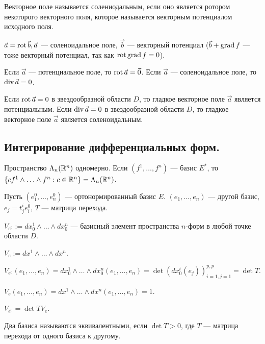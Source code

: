 \begin{Def}
	Векторное поле называется солениодальным, если оно является ротором некоторого векторного поля, которое называется векторным потенциалом исходного поля.
	
	$\vec{a}=\operatorname{rot}\vec{b}, \vec{a}$ --- соленоидальное поле, $\vec{b}$ --- векторный потенциал ($\vec{b}+\operatorname{grad} f$ --- тоже  векторный потенциал, так как $\operatorname{rot}\operatorname{grad} f=0$).
\end{Def}

\begin{corollary}[из определения]
	Если $\vec{a}$ --- потенциальное поле, то $\operatorname{rot}\vec{a}=\vec{0}$. Если $\vec{a}$ --- соленоидальное поле, то $\operatorname{div}\vec{a}=0$.
\end{corollary}

\begin{corollary}
	Если $\operatorname{rot}\vec{a}=0$ в звездообразной области $D$, то гладкое векторное поле $\vec{a}$ является потенциальным. Если $\operatorname{div}\vec{a}=0$ в звездообразной области $D$, то гладкое векторное поле $\vec{a}$ является соленоидальным.
\end{corollary}

\subsection{Интегрирование дифференциальных форм.}

Пространство $\Lambda_n(\mathbb{R}^n)$ одномерно. Если $(f^1,\ldots, f^n)$ --- базис $E^*$, то\\ $\{cf^1\wedge\ldots\wedge f^n:c\in\R^n\}=\Lambda_n(\R^n)$.

Пусть $(e_1^0,\ldots,e_n^0)$ --- ортонормированный базис $E$. $(e_1,\ldots, e_n)$ --- другой базис, $e_j=t^i_je_i^0$, $T$ --- матрица перехода.

$V_{e^0}:=dx^1_0\wedge\ldots\wedge dx^n_0$ --- базисный элемент пространства $n$-форм в любой точке области $D$.

$V_e:=dx^1\wedge\ldots\wedge dx^n$.

$V_{e^0}(e_1,\ldots, e_n)=dx^1_0\wedge\ldots\wedge dx^n_0(e_1,\ldots, e_n)=\det(dx_0^i(e_j))_{i=1,j=1}^{p,p}=\det T$.

$V_e(e_1,\ldots, e_n)=dx^1\wedge\ldots\wedge dx^n(e_1,\ldots, e_n)=1$.

\begin{prop}
	$V_{e^0}=\det TV_e$.
\end{prop}

\begin{Def}
	Два базиса называются эквивалентными, если $\det T>0$, где $T$ --- матрица перехода от одного базиса к другому.
\end{Def}

